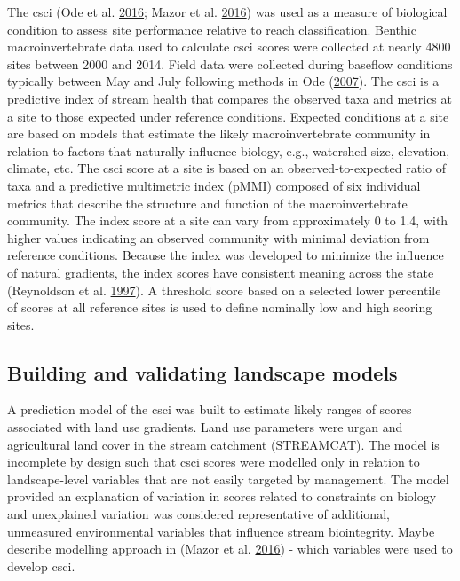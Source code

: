 \documentclass[]{article}
\begin{document}
The \ac{csci} (Ode et al. \protect\hyperlink{ref-Ode16}{2016}; Mazor et
al. \protect\hyperlink{ref-Mazor16}{2016}) was used as a measure of
biological condition to assess site performance relative to reach
classification. Benthic macroinvertebrate data used to calculate
\ac{csci} scores were collected at nearly 4800 sites between 2000 and
2014. Field data were collected during baseflow conditions typically
between May and July following methods in Ode
(\protect\hyperlink{ref-Ode07}{2007}). The \ac{csci} is a predictive
index of stream health that compares the observed taxa and metrics at a
site to those expected under reference conditions. Expected conditions
at a site are based on models that estimate the likely macroinvertebrate
community in relation to factors that naturally influence biology, e.g.,
watershed size, elevation, climate, etc. The \ac{csci} score at a site
is based on an observed-to-expected ratio of taxa and a predictive
multimetric index (pMMI) composed of six individual metrics that
describe the structure and function of the macroinvertebrate community.
The index score at a site can vary from approximately 0 to 1.4, with
higher values indicating an observed community with minimal deviation
from reference conditions. Because the index was developed to minimize
the influence of natural gradients, the index scores have consistent
meaning across the state (Reynoldson et al.
\protect\hyperlink{ref-Reynoldson97}{1997}). A threshold score based on
a selected lower percentile of scores at all reference sites is used to
define nominally low and high scoring sites.

\subsection{Building and validating landscape
models}\label{building-and-validating-landscape-models}

A prediction model of the \ac{csci} was built to estimate likely ranges
of scores associated with land use gradients. Land use parameters were
urgan and agricultural land cover in the stream catchment (STREAMCAT).
The model is incomplete by design such that \ac{csci} scores were
modelled only in relation to landscape-level variables that are not
easily targeted by management. The model provided an explanation of
variation in scores related to constraints on biology and unexplained
variation was considered representative of additional, unmeasured
environmental variables that influence stream biointegrity. Maybe
describe modelling approach in (Mazor et al.
\protect\hyperlink{ref-Mazor16}{2016}) - which variables were used to
develop \ac{csci}.
\end{document}

